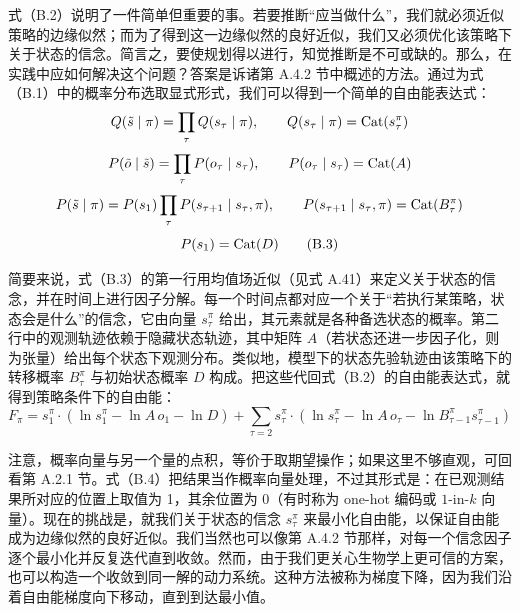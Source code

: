 式（B.2）说明了一件简单但重要的事。若要推断“应当做什么”，我们就必须近似策略的边缘似然；而为了得到这一边缘似然的良好近似，我们又必须优化该策略下关于状态的信念。简言之，要使规划得以进行，知觉推断是不可或缺的。那么，在实践中应如何解决这个问题？答案是诉诸第 A.4.2 节中概述的方法。通过为式（B.1）中的概率分布选取显式形式，我们可以得到一个简单的自由能表达式：
\begin{equation}
Q(\tilde{s}\mid \pi)=\prod_\tau Q(s_\tau\mid \pi),
\qquad
Q(s_\tau\mid \pi)=\operatorname{Cat}(s_\tau^\pi)
\end{equation}
\begin{equation}
P(\tilde{o}\mid \tilde{s})=\prod_\tau P(o_\tau\mid s_\tau),
\qquad
P(o_\tau\mid s_\tau)=\operatorname{Cat}(A)
\end{equation}
\begin{equation}
P(\tilde{s}\mid \pi)=P(s_1)\prod_\tau P(s_{\tau+1}\mid s_\tau,\pi),
\qquad
P(s_{\tau+1}\mid s_\tau,\pi)=\operatorname{Cat}(B_\tau^\pi)
\end{equation}
\begin{equation}
P(s_1)=\operatorname{Cat}(D)
\tag{B.3}
\end{equation}

简要来说，式（B.3）的第一行用均值场近似（见式 A.41）来定义关于状态的信念，并在时间上进行因子分解。每一个时间点都对应一个关于“若执行某策略，状态会是什么”的信念，它由向量 $s_\tau^\pi$ 给出，其元素就是各种备选状态的概率。第二行中的观测轨迹依赖于隐藏状态轨迹，其中矩阵 $A$（若状态还进一步因子化，则为张量）给出每个状态下观测分布。类似地，模型下的状态先验轨迹由该策略下的转移概率 $B_\tau^\pi$ 与初始状态概率 $D$ 构成。把这些代回式（B.2）的自由能表达式，就得到策略条件下的自由能：
\begin{equation}
F_\pi
=
s_1^\pi \cdot \left(\ln s_1^\pi-\ln A\,o_1-\ln D\right)
+\sum_{\tau=2} s_\tau^\pi \cdot \left(\ln s_\tau^\pi-\ln A\,o_\tau-\ln B_{\tau-1}^\pi s_{\tau-1}^\pi\right)
\tag{B.4}
\end{equation}

注意，概率向量与另一个量的点积，等价于取期望操作；如果这里不够直观，可回看第 A.2.1 节。式（B.4）把结果当作概率向量处理，不过其形式是：在已观测结果所对应的位置上取值为 1，其余位置为 0（有时称为 one-hot 编码或 $1$-in-$k$ 向量）。现在的挑战是，就我们关于状态的信念 $s_\tau^\pi$ 来最小化自由能，以保证自由能成为边缘似然的良好近似。我们当然也可以像第 A.4.2 节那样，对每一个信念因子逐个最小化并反复迭代直到收敛。然而，由于我们更关心生物学上更可信的方案，也可以构造一个收敛到同一解的动力系统。这种方法被称为梯度下降，因为我们沿着自由能梯度向下移动，直到到达最小值。

